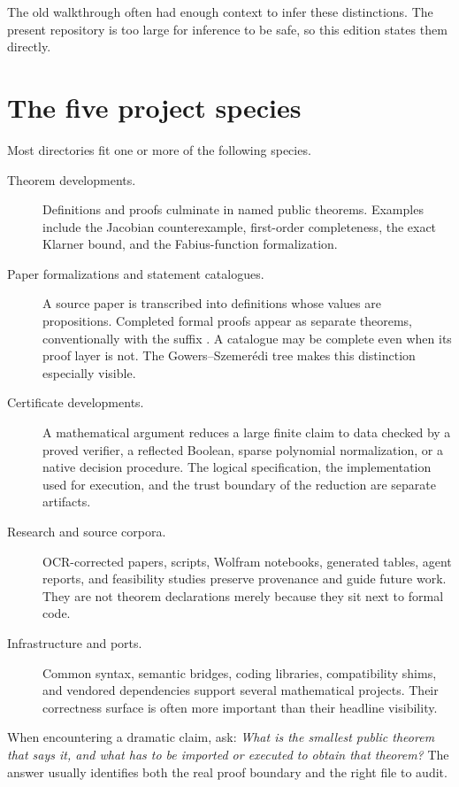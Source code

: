 \documentclass[
  10pt,
  a4paper,
  twoside,
  open=any,
  parskip=half,
  headings=big
]{scrreprt}
\newcommand{\code}[1]{\texttt{\detokenize{#1}}}
\begin{document}
The old walkthrough often had enough context to infer these distinctions. The present repository is too large for inference to be safe, so this edition states them directly.

\section{The five project species}

Most directories fit one or more of the following species.

\begin{description}
  \item[Theorem developments.] Definitions and proofs culminate in named public theorems. Examples include the Jacobian counterexample, first-order completeness, the exact Klarner bound, and the Fabius-function formalization.

  \item[Paper formalizations and statement catalogues.] A source paper is transcribed into definitions whose values are propositions. Completed formal proofs appear as separate theorems, conventionally with the suffix \code{_holds}. A catalogue may be complete even when its proof layer is not. The Gowers--Szemer\'edi tree makes this distinction especially visible.

  \item[Certificate developments.] A mathematical argument reduces a large finite claim to data checked by a proved verifier, a reflected Boolean, sparse polynomial normalization, or a native decision procedure. The logical specification, the implementation used for execution, and the trust boundary of the reduction are separate artifacts.

  \item[Research and source corpora.] OCR-corrected papers, scripts, Wolfram notebooks, generated tables, agent reports, and feasibility studies preserve provenance and guide future work. They are not theorem declarations merely because they sit next to formal code.

  \item[Infrastructure and ports.] Common syntax, semantic bridges, coding libraries, compatibility shims, and vendored dependencies support several mathematical projects. Their correctness surface is often more important than their headline visibility.
\end{description}

\Needspace{32mm}
\begin{readingbox}
When encountering a dramatic claim, ask: \emph{What is the smallest public theorem that says it, and what has to be imported or executed to obtain that theorem?} The answer usually identifies both the real proof boundary and the right file to audit.
\end{readingbox}
\end{document}
